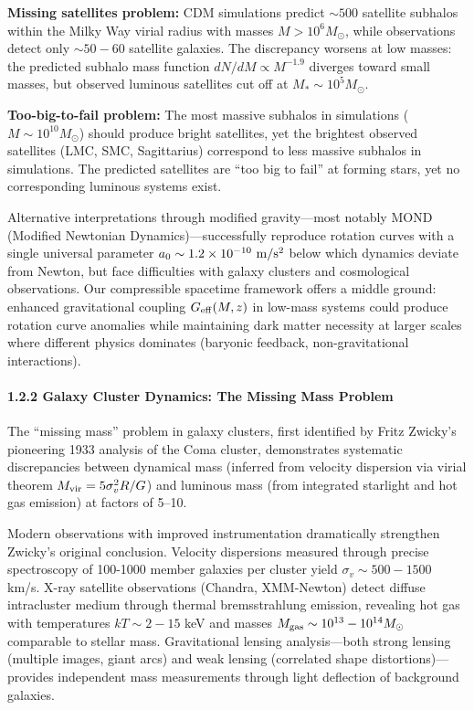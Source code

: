 \documentclass[11pt,a4paper]{article}
\begin{document}
\textbf{Missing satellites problem:} CDM simulations predict
\(\sim 500\) satellite subhalos within the Milky Way virial radius with
masses \(M > 10^6 M_\odot\), while observations detect only
\(\sim 50-60\) satellite galaxies. The discrepancy worsens at low
masses: the predicted subhalo mass function \(dN/dM \propto M^{-1.9}\)
diverges toward small masses, but observed luminous satellites cut off
at \(M_* \sim 10^5 M_\odot\).

\textbf{Too-big-to-fail problem:} The most massive subhalos in
simulations (\(M \sim 10^{10} M_\odot\)) should produce bright
satellites, yet the brightest observed satellites (LMC, SMC,
Sagittarius) correspond to less massive subhalos in simulations. The
predicted satellites are ``too big to fail'' at forming stars, yet no
corresponding luminous systems exist.

Alternative interpretations through modified gravity---most notably MOND
(Modified Newtonian Dynamics)---successfully reproduce rotation curves
with a single universal parameter
\(a_0 \sim 1.2 \times 10^{-10}~{\rm m/s^2}\) below which dynamics
deviate from Newton, but face difficulties with galaxy clusters and
cosmological observations. Our compressible spacetime framework offers a
middle ground: enhanced gravitational coupling \(G_{\rm eff}(M,z)\) in
low-mass systems could produce rotation curve anomalies while
maintaining dark matter necessity at larger scales where different
physics dominates (baryonic feedback, non-gravitational interactions).

\hypertarget{galaxy-cluster-dynamics-the-missing-mass-problem}{%
\paragraph{1.2.2 Galaxy Cluster Dynamics: The Missing Mass
Problem}\label{galaxy-cluster-dynamics-the-missing-mass-problem}}

The ``missing mass'' problem in galaxy clusters, first identified by
Fritz Zwicky's pioneering 1933 analysis of the Coma cluster,
demonstrates systematic discrepancies between dynamical mass (inferred
from velocity dispersion via virial theorem
\(M_{\rm vir} = 5\sigma_v^2 R/G\)) and luminous mass (from integrated
starlight and hot gas emission) at factors of 5--10.

Modern observations with improved instrumentation dramatically
strengthen Zwicky's original conclusion. Velocity dispersions measured
through precise spectroscopy of 100-1000 member galaxies per cluster
yield \(\sigma_v \sim 500-1500\) km/s. X-ray satellite observations
(Chandra, XMM-Newton) detect diffuse intracluster medium through thermal
bremsstrahlung emission, revealing hot gas with temperatures
\(kT \sim 2-15\) keV and masses
\(M_{\rm gas} \sim 10^{13}-10^{14} M_\odot\) comparable to stellar mass.
Gravitational lensing analysis---both strong lensing (multiple images,
giant arcs) and weak lensing (correlated shape distortions)---provides
independent mass measurements through light deflection of background
galaxies.
\end{document}
